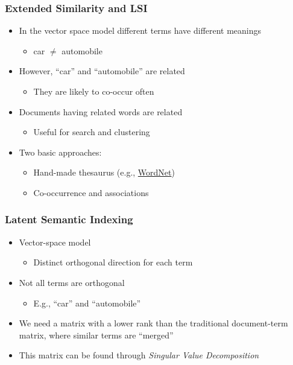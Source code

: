 \documentclass{beamer}
\begin{document}
\begin{frame}
  \frametitle{Extended Similarity and LSI}

  \begin{itemize}
  \item In the vector space model different terms have different meanings
    \begin{itemize}
    \item car $\neq$ automobile
    \end{itemize}
  \item However, ``car'' and ``automobile'' are related
    \begin{itemize}
    \item They are likely to co-occur often
    \end{itemize}
  \item Documents having related words are related
    \begin{itemize}
    \item Useful for search and clustering
    \end{itemize}
  \item Two basic approaches:
    \begin{itemize}
    \item Hand-made thesaurus (e.g., \href{http://wordnetweb.princeton.edu/perl/webwn}{WordNet})
    \item Co-occurrence and associations
    \end{itemize}
  \end{itemize}

\end{frame}


\begin{frame}
  \frametitle{Latent Semantic Indexing}

  \begin{itemize}
  \item Vector-space model
    \begin{itemize}
    \item Distinct orthogonal direction for each term
    \end{itemize}
  \item Not all terms are orthogonal
    \begin{itemize}
    \item E.g., ``car'' and ``automobile''
    \end{itemize}
  \item We need a matrix with a lower rank than the traditional document-term
    matrix, where similar terms are ``merged''
  \item This matrix can be found through \emph{Singular Value Decomposition}
  \end{itemize}

\end{frame}
\end{document}

